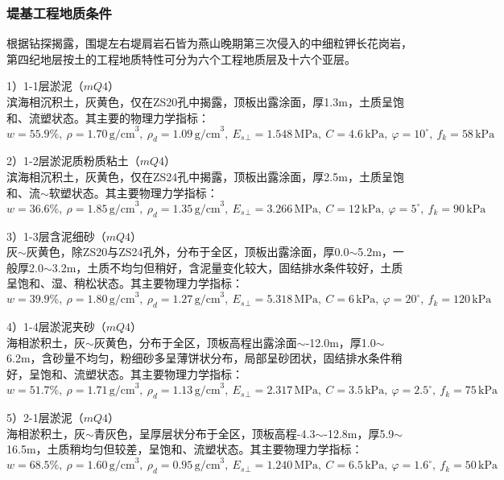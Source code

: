 \documentclass[UTF8, a4paper, 12pt]{ctexart} %
\begin{document}
\subsubsection{堤基工程地质条件}
根据钻探揭露，围堤左右堤肩岩石皆为燕山晚期第三次侵入的中细粒钾长花岗岩，第四纪地层按土的工程地质特性可分为六个工程地质层及十六个亚层。

\par 1）1-1层淤泥（$mQ4$）\\
滨海相沉积土，灰黄色，仅在ZS20孔中揭露，顶板出露涂面，厚1.3m，土质呈饱和、流塑状态。其主要的物理力学指标：
\[
w=55.9\%,\ \rho=1.70\, \text{g/cm}^3,\ \rho_d=1.09\, \text{g/cm}^3,\ E_s{_\perp}=1.548\, \text{MPa},\ C=4.6\, \text{kPa},\ \varphi=10^\circ,\ f_k=58\, \text{kPa}
\]

\par 2）1-2层淤泥质粉质粘土（$mQ4$）\\
滨海相沉积土，灰黄色，仅在ZS24孔中揭露，顶板出露涂面，厚2.5m，土质呈饱和、流$\sim$软塑状态。其主要物理力学指标：
\[
w=36.6\%,\ \rho=1.85\, \text{g/cm}^3,\ \rho_d=1.35\, \text{g/cm}^3,\ E_s{_\perp}=3.266\, \text{MPa},\ C=12\, \text{kPa},\ \varphi=5^\circ,\ f_k=90\, \text{kPa}
\]

\par 3）1-3层含泥细砂（$mQ4$）\\
灰$\sim$灰黄色，除ZS20与ZS24孔外，分布于全区，顶板出露涂面，厚0.0$\sim$5.2m，一般厚2.0$\sim$3.2m，土质不均匀但稍好，含泥量变化较大，固结排水条件较好，土质呈饱和、湿、稍松状态。其主要物理力学指标：
\[
w=39.9\%,\ \rho=1.80\, \text{g/cm}^3,\ \rho_d=1.27\, \text{g/cm}^3,\ E_s{_\perp}=5.318\, \text{MPa},\ C=6\, \text{kPa},\ \varphi=20^\circ,\ f_k=120\, \text{kPa}
\]

\par 4）1-4层淤泥夹砂（$mQ4$）\\
海相淤积土，灰$\sim$灰黄色，分布于全区，顶板高程出露涂面$\sim$-12.0m，厚1.0$\sim$6.2m，含砂量不均匀，粉细砂多呈薄饼状分布，局部呈砂团状，固结排水条件稍好，呈饱和、流塑状态。其主要物理力学指标：
\[
w=51.7\%,\ \rho=1.71\, \text{g/cm}^3,\ \rho_d=1.13\, \text{g/cm}^3,\ E_s{_\perp}=2.317\, \text{MPa},\ C=3.5\, \text{kPa},\ \varphi=2.5^\circ,\ f_k=75\, \text{kPa}
\]

\par 5）2-1层淤泥（$mQ4$）\\
海相淤积土，灰$\sim$青灰色，呈厚层状分布于全区，顶板高程-4.3$\sim$-12.8m，厚5.9$\sim$16.5m，土质稍均匀但较差，呈饱和、流塑状态。其主要物理力学指标：
\[
w=68.5\%,\ \rho=1.60\, \text{g/cm}^3,\ \rho_d=0.95\, \text{g/cm}^3,\ E_s{_\perp}=1.240\, \text{MPa},\ C=6.5\, \text{kPa},\ \varphi=1.6^\circ,\ f_k=50\, \text{kPa}
\]
\end{document}
